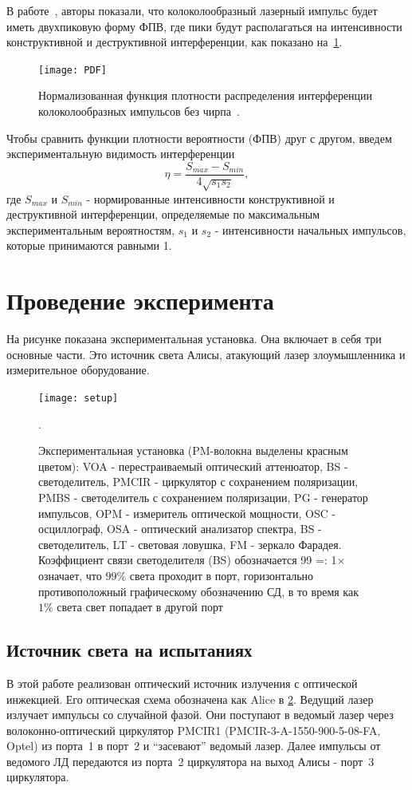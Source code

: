 В работе~\cite{shakhovoy2021}, авторы показали, что колоколообразный лазерный импульс будет иметь двухпиковую форму ФПВ, где пики будут располагаться на интенсивности конструктивной и деструктивной интерференции, как показано на~\cref{fig:PDF}.
\begin{figure}
\texttt{[image: PDF]}
\caption{Нормализованная функция плотности распределения интерференции колоколообразных импульсов без чирпа~\cite{shakhovoy2021}.}
\label{fig:PDF}
\end{figure}
Чтобы сравнить функции плотности вероятности (ФПВ) друг с другом, введем экспериментальную видимость интерференции
\begin{equation}
\label{eq:visibility}
	\eta = {\frac{S_{max} - S_{min}}{4\sqrt{s_1 s_2}}},
\end{equation}
где $S_{max}$ и $S_{min}$ - нормированные интенсивности конструктивной и деструктивной интерференции, определяемые по максимальным экспериментальным вероятностям, $s_1$ и $s_2$ - интенсивности начальных импульсов, которые принимаются равными 1.
\section{Проведение эксперимента}
\label{sec:experiment} 

На рисунке  показана экспериментальная установка. Она включает в себя три основные части. Это источник света Алисы, атакующий лазер злоумышленника и измерительное оборудование.
\begin{figure}
\texttt{[image: setup]}
\caption{Экспериментальная установка (PM-волокна выделены красным цветом): VOA - перестраиваемый оптический аттенюатор, BS - светоделитель, PMCIR - циркулятор с сохранением поляризации, PMBS - светоделитель с сохранением поляризации, PG - генератор импульсов, OPM - измеритель оптической мощности, OSC - осциллограф, OSA - оптический анализатор спектра, BS - светоделитель, LT - световая ловушка, FM - зеркало Фарадея. Коэффициент связи светоделителя (BS) обозначается 99 =: 1× означает, что $99\%$ света проходит в порт, горизонтально противоположный графическому обозначению СД, в то время как $1\%$ света
свет попадает в другой порт}.
\label{fig:setup}
\end{figure}
\subsection{Источник света на испытаниях}

В этой работе реализован оптический источник излучения с оптической инжекцией. Его оптическая схема обозначена как Alice в \cref{fig:setup}. Ведущий лазер излучает импульсы со случайной фазой. Они поступают в ведомый лазер через волоконно-оптический циркулятор PMCIR1 (PMCIR-3-A-1550-900-5-08-FA, Optel) из порта~1 в порт~2 и ``засевают'' ведомый лазер. Далее импульсы от ведомого ЛД передаются из порта~2 циркулятора на выход Алисы - порт~3 циркулятора.

